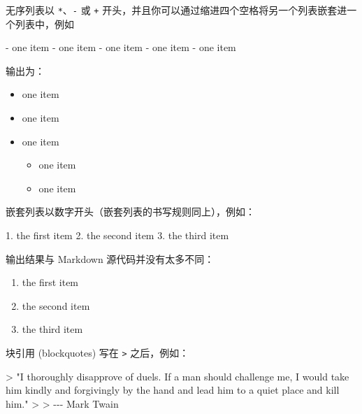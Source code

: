 \documentclass[
  12pt,
]{krantz}
\newenvironment{Shaded}{\begin{snugshade}}{\end{snugshade}}
\newcommand{\AttributeTok}[1]{\textcolor[rgb]{0.13,0.29,0.53}{#1}}
\newcommand{\NormalTok}[1]{#1}
\newcommand{\SpecialStringTok}[1]{\textcolor[rgb]{0.31,0.60,0.02}{#1}}
\providecommand{\tightlist}{%
  \setlength{\itemsep}{0pt}\setlength{\parskip}{0pt}}
\theoremstyle{definition}
\theoremstyle{definition}
\theoremstyle{definition}
\theoremstyle{definition}
\theoremstyle{remark}
\begin{document}
无序列表以 \texttt{*}、\texttt{-} 或 \texttt{+} 开头，并且你可以通过缩进四个空格将另一个列表嵌套进一个列表中，例如

\begin{Shaded}
\begin{Highlighting}[]
\SpecialStringTok{{-} }\NormalTok{one item}
\SpecialStringTok{{-} }\NormalTok{one item}
\SpecialStringTok{{-} }\NormalTok{one item}
\SpecialStringTok{    {-} }\NormalTok{one item}
\SpecialStringTok{    {-} }\NormalTok{one item}
\end{Highlighting}
\end{Shaded}

输出为：

\begin{itemize}
\tightlist
\item
  one item
\item
  one item
\item
  one item

  \begin{itemize}
  \tightlist
  \item
    one item
  \item
    one item
  \end{itemize}
\end{itemize}

嵌套列表以数字开头（嵌套列表的书写规则同上），例如：

\begin{Shaded}
\begin{Highlighting}[]
\SpecialStringTok{1. }\NormalTok{the first item}
\SpecialStringTok{2. }\NormalTok{the second item}
\SpecialStringTok{3. }\NormalTok{the third item}
\end{Highlighting}
\end{Shaded}

输出结果与 Markdown 源代码并没有太多不同：

\begin{enumerate}
\def\labelenumi{\arabic{enumi}.}
\tightlist
\item
  the first item
\item
  the second item
\item
  the third item
\end{enumerate}

块引用 (blockquotes) 写在 \texttt{\textgreater{}} 之后，例如：

\begin{Shaded}
\begin{Highlighting}[]
\AttributeTok{\textgreater{} "I thoroughly disapprove of duels. If a man should challenge me,}
\AttributeTok{  I would take him kindly and forgivingly by the hand and lead him}
\AttributeTok{  to a quiet place and kill him."}
\AttributeTok{\textgreater{}}
\AttributeTok{\textgreater{} {-}{-}{-} Mark Twain}
\end{Highlighting}
\end{Shaded}
\end{document}
